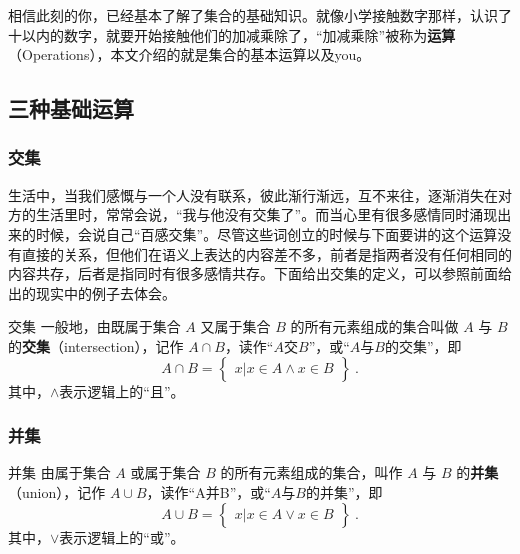 
\begin{issues}
\issueDraft
\end{issues}
相信此刻的你，已经基本了解了集合的基础知识。就像小学接触数字那样，认识了十以内的数字，就要开始接触他们的加减乘除了，“加减乘除”被称为\textbf{运算}（Operations），本文介绍的就是集合的基本运算以及you。

\subsection{三种基础运算}

\subsubsection{交集}

生活中，当我们感慨与一个人没有联系，彼此渐行渐远，互不来往，逐渐消失在对方的生活里时，常常会说，“我与他没有交集了”。而当心里有很多感情同时涌现出来的时候，会说自己“百感交集”。尽管这些词创立的时候与下面要讲的这个运算没有直接的关系，但他们在语义上表达的内容差不多，前者是指两者没有任何相同的内容共存，后者是指同时有很多感情共存。下面给出交集的定义，可以参照前面给出的现实中的例子去体会。

\begin{definition}{交集}
一般地，由既属于集合 $A$ 又属于集合 $B$ 的所有元素组成的集合叫做 $A$ 与 $B$ 的\textbf{交集}（intersection），记作 $A \cap B$，读作“$A$交$B$”，或“$A$与$B$的交集”，即
\begin{equation}
A\cap B = \begin{Bmatrix} x|x\in A\land x\in B \end{Bmatrix}~.
\end{equation}
其中，$\land$表示逻辑上的“且”。
\end{definition}


\subsubsection{并集}
\begin{definition}{并集}
由属于集合 $A$ 或属于集合 $B$ 的所有元素组成的集合，叫作 $A$ 与 $B$ 的\textbf{并集}（union），记作 $A\cup B$，读作“A并B”，或“$A$与$B$的并集”，即
\begin{equation}
A\cup B = \begin{Bmatrix}x|x\in A \lor x\in B\end{Bmatrix}~.
\end{equation}
其中，$\lor$表示逻辑上的“或”。
\end{definition}


